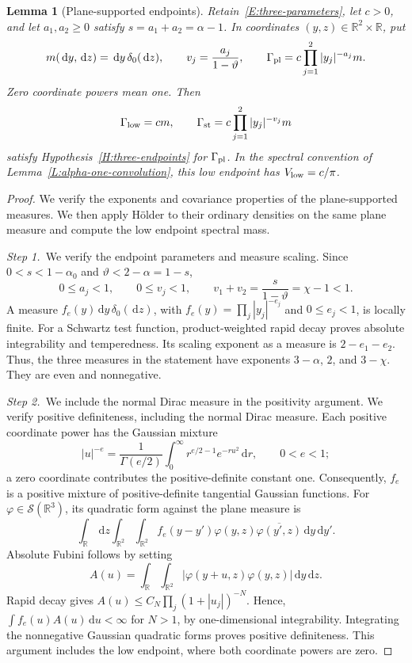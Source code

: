 \documentclass[12pt,oneside,openany]{book}
\makeatletter
\let\lean@pending\@empty
\newcommand{\LeanMarker}[1]{\gdef\lean@pending{#1}}
\numberwithin{equation}{section}
\newtheorem{lemma}[theorem]{Lemma}
\theoremstyle{nogostyle}
\theoremstyle{definition}
\newcommand{\R}{\mathbb{R}}
\newcommand{\ud}{\,\mathrm{d}}
\makeatother
\begin{document}
\LeanMarker{L:plane-endpoints}
\begin{lemma}[Plane-supported endpoints]\label{L:plane-endpoints}
  Retain~\eqref{E:three-parameters}, let $c > 0$, and let $a_1,a_2 \ge 0$
  satisfy $s = a_1+a_2 = \alpha-1$. In coordinates $(y,z) \in \R^2\times\R$, put
  \[
    m(\ud y,\ud z)=\ud y\,\delta_0(\ud z),\qquad
    v_j=\frac{a_j}{1-\vartheta},\qquad
    \Gamma_{\rm pl}=c\prod_{j=1}^2|y_j|^{-a_j}m.
  \]
  Zero coordinate powers mean one. Then
  \[
    \Gamma_{\rm low}=cm,\qquad
    \Gamma_{\rm st}=c\prod_{j=1}^2|y_j|^{-v_j}m
  \]
  satisfy Hypothesis~\ref{H:three-endpoints} for $\Gamma_{\rm pl}$. In the
  spectral convention of Lemma~\ref{L:alpha-one-convolution}, this low endpoint
  has $V_{\rm low} = c/\pi$.
\end{lemma}

\begin{proof}
  We verify the exponents and covariance properties of the plane-supported
  measures. We then apply Hölder to their ordinary densities on the same plane
  measure and compute the low endpoint spectral mass.


  \medskip
  \noindent\textit{Step 1.~}We verify the endpoint parameters and measure
  scaling.
  Since $0 < s < 1-\alpha_0$ and $\vartheta < 2-\alpha = 1-s$,
  \[
    0\le a_j<1,\qquad 0\le v_j<1,\qquad
    v_1+v_2=\frac{s}{1-\vartheta}=\chi-1<1.
  \]
  A measure $f_e(y)\ud y\,\delta_0(\ud z)$, with $f_e(y) = \prod_j|y_j|^{-e_j}$
  and $0 \le e_j < 1$, is locally finite. For a Schwartz test function,
  product-weighted rapid decay proves absolute integrability and temperedness.
  Its scaling exponent as a measure is $2-e_1-e_2$. Thus, the three measures in
  the statement have exponents $3-\alpha$, $2$, and $3-\chi$. They are even and
  nonnegative.


  \medskip
  \noindent\textit{Step 2.~}We include the normal Dirac measure in the
  positivity argument.
  We verify positive definiteness, including the normal Dirac measure. Each
  positive coordinate power has the Gaussian mixture
  \[
    |u|^{-e}=\frac1{\Gamma(e/2)}
    \int_0^\infty r^{e/2-1}e^{-ru^2}\ud r,\qquad 0<e<1;
  \]
  a zero coordinate contributes the positive-definite constant one.
  Consequently, $f_e$ is a positive mixture of positive-definite tangential
  Gaussian functions. For $\varphi \in \mathcal{S}(\R^3)$, its quadratic form
  against the plane measure is
  \[
    \int_\R\ud z\int_{\R^2}\int_{\R^2}
    f_e(y-y')\varphi(y,z)\overline{\varphi(y',z)}
    \ud y\ud y'.
  \]
  Absolute Fubini follows by setting
  \[
    A(u)=\int_\R\int_{\R^2}
    |\varphi(y+u,z)\varphi(y,z)|\ud y\ud z.
  \]
  Rapid decay gives $A(u) \le C_N\prod_j(1+|u_j|)^{-N}$. Hence, $\int
  f_e(u)A(u)\ud u < \infty$ for $N > 1$, by one-dimensional integrability.
  Integrating the nonnegative Gaussian quadratic forms proves positive
  definiteness. This argument includes the low endpoint, where both coordinate
  powers are zero.



\end{proof}
\end{document}

